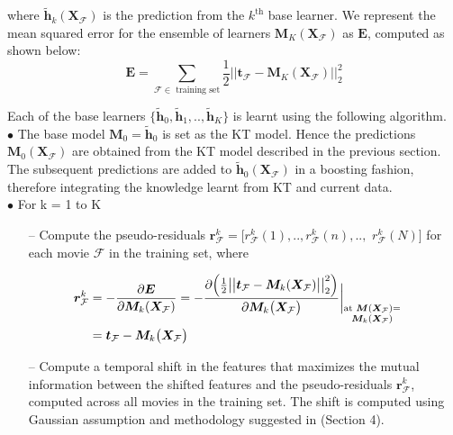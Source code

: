 \documentclass{article}
\begin{document}
\begin{spacing}{0.9}
where $\tilde{\bm h}_k(\bm X_\mathcal F)$ is the prediction from the $k^\text{th}$ base learner.
We represent the mean squared error for the ensemble of learners $\bm M_K(\bm X_\mathcal F)$ as $\bm E$, computed as shown below: 
\begin{equation}
\bm E = \sum_\text{$\mathcal F \in$ training set} \frac{1}{2}||\bm t_\mathcal F - \bm M_K(\bm X_\mathcal F)||_2^2 
\end{equation}

Each of the base learners $\{\tilde{\bm h}_0, \tilde{\bm h}_1, .., \tilde{\bm h}_K\}$ is learnt using the following algorithm.
\\

\noindent$\bullet$ The base model $\bm M_0 = \tilde{\bm h}_0$ is set as the KT model. 
Hence the predictions $\bm M_0(\bm X_\mathcal F)$ are obtained from the KT model described in the previous section. 
The subsequent predictions are added to $\tilde{\bm h}_0(\bm X_\mathcal F)$ in a boosting fashion, therefore integrating the knowledge learnt from KT and current data.\\ 

\noindent $\bullet$ For k = 1 to K 

\begin{itemize}
\item[--] Compute the pseudo-residuals ${\bm r}_{\mathcal F}^k = [r^k_\mathcal F(1), .., r^k_\mathcal F(n), .., $ $r^k_\mathcal F(N)]$ for each movie $\mathcal F$ in the training set, where	

\begin{equation} \label{pseudores}
\vspace{-1mm}
\begin{aligned}
\hspace{-4mm}\bm r^k_\mathcal F &= -\frac {\partial \bm E} {\partial \bm M_k(\bm X_\mathcal F)} 
= - { \frac {\partial \Big({\frac{1}{2}\big|\big| \bm t_\mathcal F - {\bm M}_k (\bm X_\mathcal F)\big|\big|^2_2}\Big)} {\partial {\bm M}_k\big({\bm X}_\mathcal F\big)} \bigg|}_{\substack{{\text{at }{\bm M}({\bm X}_\mathcal F) =} \\ {{\bm M}_k({\bm X}_\mathcal F)}}}\\
&= \bm t_\mathcal F - \bm M_k\big( \bm X_\mathcal F \big)
\end{aligned}
\end{equation}

\item[--] Compute a temporal shift in the features that maximizes the mutual information between the shifted features and the pseudo-residuals $\bm r^k_\mathcal F$, computed across all movies in the training set.
The shift is computed using Gaussian assumption and methodology suggested in \cite{mariooryad2015correcting} (Section 4).


\end{itemize}
\end{spacing}
\end{document}
